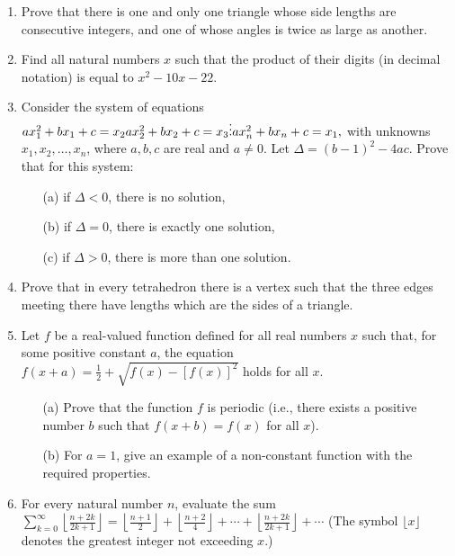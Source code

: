 \documentclass{article}
\begin{document}
\begin{enumerate}
    \item Prove that there is one and only one triangle whose side lengths are consecutive integers, and one of whose angles is twice as large as another.

    \item Find all natural numbers \( x \) such that the product of their digits (in decimal notation) is equal to \( x^2 - 10x - 22 \).

    \item Consider the system of equations
    $
    ax_1^2 + bx_1 + c = x_2 \\
    ax_2^2 + bx_2 + c = x_3 \\
    \vdots \\
    ax_n^2 + bx_n + c = x_1,
    $
    with unknowns \( x_1, x_2, \dots, x_n \), where \( a, b, c \) are real and \( a \ne 0 \). Let \( \Delta = (b - 1)^2 - 4ac \). Prove that for this system:
    \begin{itemize}
        \item[(a)] if \( \Delta < 0 \), there is no solution,
        \item[(b)] if \( \Delta = 0 \), there is exactly one solution,
        \item[(c)] if \( \Delta > 0 \), there is more than one solution.
    \end{itemize}

    \item Prove that in every tetrahedron there is a vertex such that the three edges meeting there have lengths which are the sides of a triangle.

    \item Let \( f \) be a real-valued function defined for all real numbers \( x \) such that, for some positive constant \( a \), the equation
    $
    f(x + a) = \frac{1}{2} + \sqrt{f(x) - [f(x)]^2}
    $
    holds for all \( x \).
    \begin{itemize}
        \item[(a)] Prove that the function \( f \) is periodic (i.e., there exists a positive number \( b \) such that \( f(x + b) = f(x) \) for all \( x \)).
        \item[(b)] For \( a = 1 \), give an example of a non-constant function with the required properties.
    \end{itemize}

    \item For every natural number \( n \), evaluate the sum
    $
    \sum_{k=0}^{\infty} \left\lfloor \frac{n + 2k}{2k + 1} \right\rfloor = \left\lfloor \frac{n + 1}{2} \right\rfloor + \left\lfloor \frac{n + 2}{4} \right\rfloor + \cdots + \left\lfloor \frac{n + 2k}{2k + 1} \right\rfloor + \cdots
    $
    (The symbol \( \lfloor x \rfloor \) denotes the greatest integer not exceeding \( x \).)

\end{enumerate}
\end{document}
